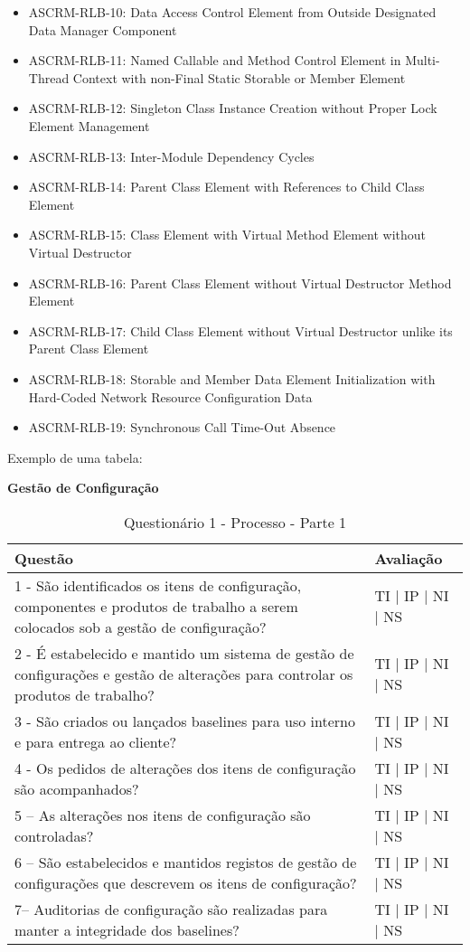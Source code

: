 \documentclass[openany,10pt,a4paper]{article}
\begin{document}
\begin{appendix}
\begin{itemize}
	\item ASCRM-RLB-10: Data Access Control Element from Outside Designated Data Manager Component
	\item ASCRM-RLB-11: Named Callable and Method Control Element in Multi-Thread Context with non-Final Static Storable or Member Element
	\item ASCRM-RLB-12: Singleton Class Instance Creation without Proper Lock Element Management
	\item ASCRM-RLB-13: Inter-Module Dependency Cycles
	\item ASCRM-RLB-14: Parent Class Element with References to Child Class Element
	\item ASCRM-RLB-15: Class Element with Virtual Method Element without Virtual Destructor
	\item ASCRM-RLB-16: Parent Class Element without Virtual Destructor Method Element
	\item ASCRM-RLB-17: Child Class Element without Virtual Destructor unlike its Parent Class Element
	\item ASCRM-RLB-18: Storable and Member Data Element Initialization with Hard-Coded Network Resource Configuration Data
	\item ASCRM-RLB-19: Synchronous Call Time-Out Absence
\end{itemize}


Exemplo de uma tabela:\\

\begin{table}[h]
\textbf{Gestão de Configuração}
	\centering
	\caption{Questionário 1 - Processo - Parte 1}
	\begin{tabular}{p{3.5in}p{2in}}		
		\toprule
		\textbf{Questão}  & \textbf{Avaliação}\\ 
		\midrule
		1 - São identificados os itens de configuração, componentes e produtos de trabalho a serem 
colocados sob a gestão de configuração?
 & TI | IP | NI | NS \\
        \midrule
		2 - É estabelecido e mantido um sistema de gestão de configurações e gestão de alterações para 
controlar os produtos de trabalho?
 & TI | IP | NI | NS \\
		\midrule
		3 -  São criados ou lançados baselines para uso interno e para entrega ao cliente?
 & TI | IP | NI | NS \\
		\midrule
		4 - Os pedidos de alterações dos itens de configuração são acompanhados?
 & TI | IP | NI | NS \\
		\midrule
		5 – As alterações nos itens de configuração são controladas?
  & TI | IP | NI | NS \\
		\midrule
		6 – São estabelecidos e mantidos registos de gestão de configurações que descrevem os itens 
de configuração?
 & TI | IP | NI | NS \\
		\midrule
		7– Auditorias de configuração são realizadas para manter a integridade dos baselines?
 & TI | IP | NI | NS \\
		\bottomrule
	\end{tabular} 
	\label{tab:tabela1}
\end{table}


\end{appendix}
\end{document}
